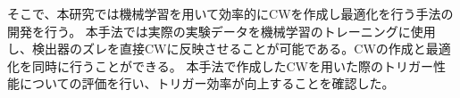 そこで、本研究では機械学習を用いて効率的にCWを作成し最適化を行う手法の開発を行う。
本手法では実際の実験データを機械学習のトレーニングに使用し、検出器のズレを直接CWに反映させることが可能である。CWの作成と最適化を同時に行うことができる。
本手法で作成したCWを用いた際のトリガー性能についての評価を行い、トリガー効率が向上することを確認した。





